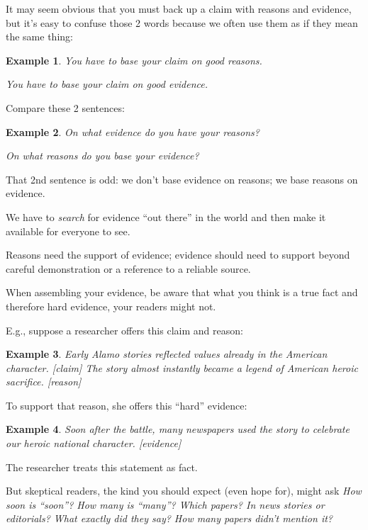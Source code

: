 \documentclass[oneside]{book}
\numberwithin{equation}{section}
\newtheorem{example}{Example}[section]
\begin{document}
%

It may seem obvious that you must back up a claim with reasons and evidence, but it's easy to confuse those 2 words because we often use them as if they mean the same thing:
\begin{example}
    You have to base your claim on good reasons.
    
    You have to base your claim on good evidence.
\end{example}

Compare these 2 sentences:
\begin{example}
    On what evidence do you have your reasons?
    
    On what reasons do you base your evidence?
\end{example}
That 2nd sentence is odd: we don't base evidence on reasons; we base reasons on evidence.


We have to \textit{search} for evidence ``out there'' in the world and then make it available for everyone to see.

Reasons need the support of evidence; evidence should need to support beyond careful demonstration or a reference to a reliable source.

%
When assembling your evidence, be aware that what you think is a true fact and therefore hard evidence, your readers might not.

E.g., suppose a researcher offers this claim and reason:
\begin{example}
    Early Alamo stories reflected values already in the American character. \emph{[claim}] The story almost instantly became a legend of American heroic sacrifice. \emph{[reason]}
\end{example}
To support that reason, she offers this ``hard'' evidence:
\begin{example}
    Soon after the battle, many newspapers used the story to celebrate our heroic national character. \emph{[evidence]}
\end{example}
The researcher treats this statement as fact.

But skeptical readers, the kind you should expect (even hope for), might ask \textit{How soon is ``soon''? How many is ``many''? Which papers? In news stories or editorials? What exactly did they say? How many papers didn't mention it?}
\end{document}
